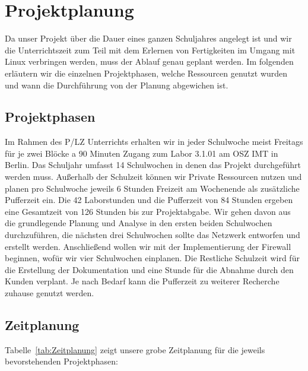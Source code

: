 \section{Projektplanung} 
\label{sec:Projektplanung}

Da unser Projekt über die Dauer eines ganzen Schuljahres angelegt ist und wir die Unterrichtszeit zum Teil mit dem Erlernen von Fertigkeiten im Umgang mit Linux verbringen werden, muss der Ablauf genau geplant werden. Im folgenden erläutern wir die einzelnen Projektphasen, welche Ressourcen genutzt wurden und wann die Durchführung von der Planung abgewichen ist.

\subsection{Projektphasen}
\label{sec:Projektphasen}
Im Rahmen des \ac{P/LZ} Unterrichts erhalten wir in jeder Schulwoche meist Freitags für je zwei Blöcke a 90 Minuten Zugang zum Labor 3.1.01 am \ac{OSZ IMT} in Berlin. Das Schuljahr umfasst 14 Schulwochen in denen das Projekt durchgeführt werden muss. Außerhalb der Schulzeit können wir Private Ressourcen nutzen und planen pro Schulwoche jeweils 6 Stunden Freizeit am Wochenende als zusätzliche Pufferzeit ein. Die 42 Laborstunden und die Pufferzeit von 84 Stunden ergeben eine Gesamtzeit von 126 Stunden bis zur Projektabgabe.
Wir gehen davon aus die grundlegende Planung und Analyse in den ersten beiden Schulwochen durchzuführen, die nächsten drei Schulwochen sollte das Netzwerk entworfen und erstellt werden. Anschließend wollen wir mit der Implementierung der Firewall beginnen, wofür wir \ca vier Schulwochen einplanen. Die Restliche Schulzeit wird für die Erstellung der Dokumentation und eine Stunde für die Abnahme durch den Kunden verplant. Je nach Bedarf kann die Pufferzeit zu weiterer Recherche zuhause genutzt werden.

\subsection{Zeitplanung}
\label{sec:Zeitplanung}

Tabelle~\ref{tab:Zeitplanung} zeigt unsere grobe Zeitplanung für die jeweils bevorstehenden Projektphasen:

